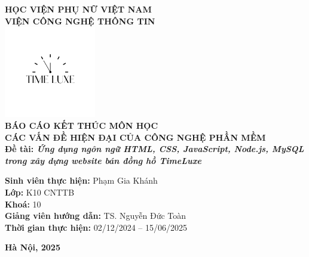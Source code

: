 \documentclass[a4paper,12pt]{report}
\begin{document}
\begin{titlepage}
\begin{mdframed}[linewidth=4pt, linecolor=black]
    \centering
{\bfseries\LARGE HỌC VIỆN PHỤ NỮ VIỆT NAM\\[0.2cm]
VIỆN CÔNG NGHỆ THÔNG TIN}\\[1cm]

\includegraphics[width=0.3\textwidth]{static/logo TIME LUXE.png}\\[1.2cm]

{\bfseries\LARGE BÁO CÁO KẾT THÚC MÔN HỌC\\[0.2cm]
CÁC VẤN ĐỀ HIỆN ĐẠI CỦA CÔNG NGHỆ PHẦN MỀM}\\[1cm]

{\bfseries\Large Đề tài: \textit{Ứng dụng ngôn ngữ HTML, CSS, JavaScript, Node.js, MySQL trong xây dựng website bán đồng hồ TimeLuxe}}\\[1.5cm]

\begin{flushleft}
\textbf{Sinh viên thực hiện:} Phạm Gia Khánh\\[0.2cm]
\textbf{Lớp:} K10 CNTTB\\[0.2cm]
\textbf{Khoá:} 10\\[0.2cm]
\textbf{Giảng viên hướng dẫn:} TS. Nguyễn Đức Toàn\\[0.2cm]
\textbf{Thời gian thực hiện:} 02/12/2024 -- 15/06/2025\\
\end{flushleft}
\vspace{1.5cm}
\textbf{Hà Nội, 2025}
\end{mdframed}
\end{titlepage}
\newpage
\end{document}
